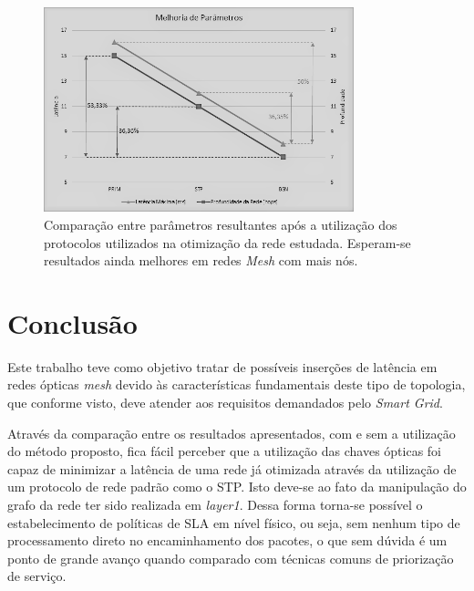 \documentclass[12pt]{article}
\begin{document}
\begin{figure}[ht] %
	\centering
	\includegraphics[width=9cm]{Tabela2GraficoPB}
	\caption{Comparação entre parâmetros resultantes após a utilização dos protocolos utilizados na otimização da rede estudada. Esperam-se resultados ainda melhores em redes \emph{Mesh} com mais nós.}
	\label{fig_tab_percentual}
\end{figure}

\section{Conclusão}

%
Este trabalho teve como objetivo tratar de possíveis inserções de latência em redes ópticas \emph{mesh} devido às características fundamentais deste tipo de topologia, que conforme visto, deve atender aos requisitos demandados pelo \emph{Smart Grid}.

Através da comparação entre os resultados apresentados, com e sem a utilização do método proposto, fica fácil perceber que a utilização das chaves ópticas foi capaz de minimizar a latência de uma rede já otimizada através da utilização de um protocolo de rede padrão como o STP. Isto deve-se ao fato da manipulação do grafo da rede ter sido realizada em \emph{layer1}. Dessa forma torna-se possível o estabelecimento de políticas de SLA em nível físico, ou seja, sem nenhum tipo de processamento direto no encaminhamento dos pacotes, o que sem dúvida é um ponto de grande avanço quando comparado com técnicas comuns de priorização de serviço.
\end{document}
